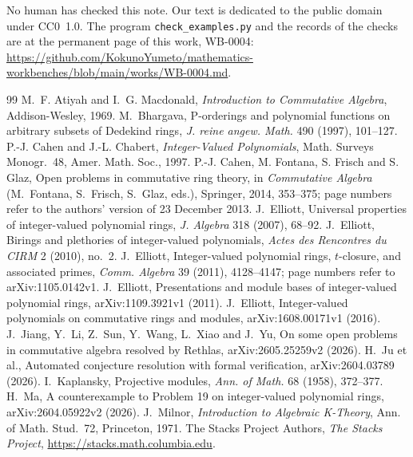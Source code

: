 \documentclass[11pt,a4paper]{article}
\theoremstyle{plain}
\theoremstyle{remark}
\newcommand{\workbenchurl}{https://github.com/KokunoYumeto/mathematics-workbenches/blob/main/works/WB-0004.md}
\begin{document}
No human has checked this note. Our text is dedicated to the public domain under CC0~1.0. The program
\texttt{check\_examples.py} and the records of the checks are at the permanent page of this work, WB-0004:
\url{\workbenchurl}.

\begin{thebibliography}{99}\small
{} M.~F. Atiyah and I.~G. Macdonald, \emph{Introduction to Commutative Algebra}, Addison-Wesley, 1969.
 M.~Bhargava, P-orderings and polynomial functions on arbitrary subsets of Dedekind rings,
\emph{J. reine angew. Math.} 490 (1997), 101--127.
 P.-J. Cahen and J.-L. Chabert, \emph{Integer-Valued Polynomials}, Math. Surveys Monogr.~48, Amer. Math.
Soc., 1997.
 P.-J. Cahen, M. Fontana, S. Frisch and S. Glaz, Open problems in commutative ring theory, in
\emph{Commutative Algebra} (M.~Fontana, S.~Frisch, S.~Glaz, eds.), Springer, 2014, 353--375; page numbers refer to
the authors' version of 23 December 2013.
 J.~Elliott, Universal properties of integer-valued polynomial rings, \emph{J. Algebra} 318 (2007),
68--92.
 J.~Elliott, Birings and plethories of integer-valued polynomials, \emph{Actes des Rencontres du CIRM}
2 (2010), no.~2.
 J.~Elliott, Integer-valued polynomial rings, $t$-closure, and associated primes, \emph{Comm.
Algebra} 39 (2011), 4128--4147; page numbers refer to arXiv:1105.0142v1.
 J.~Elliott, Presentations and module bases of integer-valued polynomial rings, arXiv:1109.3921v1
(2011).
 J.~Elliott, Integer-valued polynomials on commutative rings and modules, arXiv:1608.00171v1 (2016).
 J.~Jiang, Y.~Li, Z.~Sun, Y.~Wang, L.~Xiao and J.~Yu, On some open problems in commutative algebra
resolved by Rethlas, arXiv:2605.25259v2 (2026).
 H.~Ju et al., Automated conjecture resolution with formal verification, arXiv:2604.03789 (2026).
 I.~Kaplansky, Projective modules, \emph{Ann. of Math.} 68 (1958), 372--377.
 H.~Ma, A counterexample to Problem 19 on integer-valued polynomial rings, arXiv:2604.05922v2 (2026).
 J.~Milnor, \emph{Introduction to Algebraic K-Theory}, Ann. of Math. Stud.~72, Princeton, 1971.
 The Stacks Project Authors, \emph{The Stacks Project}, \url{https://stacks.math.columbia.edu}.
\end{thebibliography}
\end{document}
